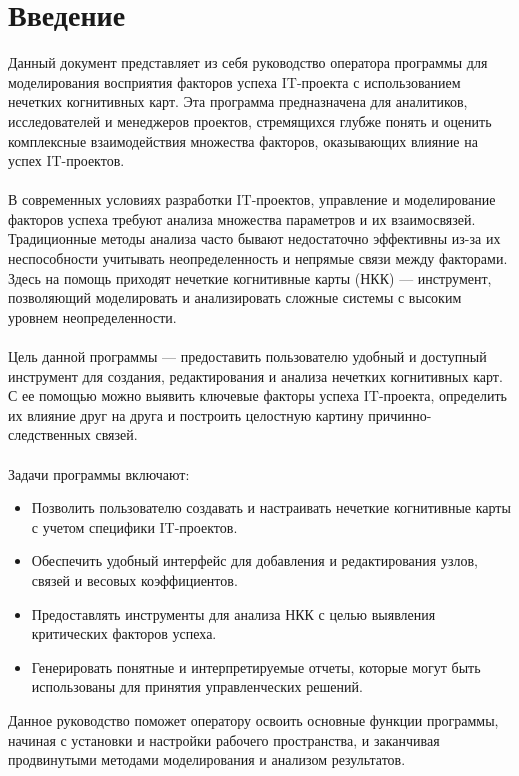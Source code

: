 \documentclass{article}
\begin{document}
    \section{Введение}
    Данный документ представляет из себя руководство оператора программы для моделирования восприятия факторов успеха IT-проекта с использованием нечетких когнитивных карт. Эта программа предназначена для аналитиков, исследователей и менеджеров проектов, стремящихся глубже понять и оценить комплексные взаимодействия множества факторов, оказывающих влияние на успех IT-проектов.\\
    ~\\
    В современных условиях разработки IT-проектов, управление и моделирование факторов успеха требуют анализа множества параметров и их взаимосвязей. Традиционные методы анализа часто бывают недостаточно эффективны из-за их неспособности учитывать неопределенность и непрямые связи между факторами. Здесь на помощь приходят нечеткие когнитивные карты (НКК) — инструмент, позволяющий моделировать и анализировать сложные системы с высоким уровнем неопределенности.\\
    ~\\
    Цель данной программы — предоставить пользователю удобный и доступный инструмент для создания, редактирования и анализа нечетких когнитивных карт. С ее помощью можно выявить ключевые факторы успеха IT-проекта, определить их влияние друг на друга и построить целостную картину причинно-следственных связей.\\
    ~\\
    Задачи программы включают:\\
    \begin{itemize}
        \item Позволить пользователю создавать и настраивать нечеткие когнитивные карты с учетом специфики IT-проектов.
        \item Обеспечить удобный интерфейс для добавления и редактирования узлов, связей и весовых коэффициентов.
        \item Предоставлять инструменты для анализа НКК с целью выявления критических факторов успеха.
        \item Генерировать понятные и интерпретируемые отчеты, которые могут быть использованы для принятия управленческих решений.
    \end{itemize}
    Данное руководство поможет оператору освоить основные функции программы, начиная с установки и настройки рабочего пространства, и заканчивая продвинутыми методами моделирования и анализом результатов.
\end{document}
